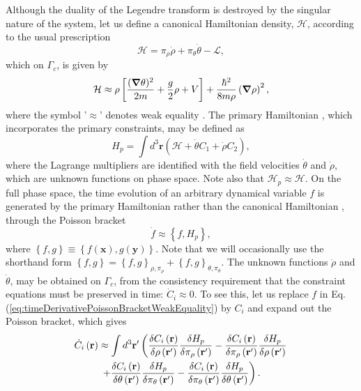 \documentclass[twocolumn, nofootinbib, nobibnotes, amsmath,amssymb,aps, pra, floatfix]{revtex4-1}
\renewcommand{\v}[1]{\ensuremath{\mathbf{#1}}} %
\newcommand{\gv}[1]{\ensuremath{\mbox{\boldmath$ #1 $}}} %
\newcommand{\grad}[1]{\gv{\nabla} #1} %
\begin{document}
Although the duality of the Legendre transform is destroyed by the singular nature of the system, let us define a canonical Hamiltonian density, $\mathcal{H}$, according to the usual prescription
\begin{equation}
  \mathcal{H}=\pi_{\rho}\dot{\rho}+\pi_{\theta}\dot{\theta}-\mathcal{L},
  \label{}
\end{equation}
which on $\Gamma_c$, is given by
\begin{equation}
  \mathcal{H}\approx\rho\left[ \frac{(\grad{\theta})^2}{2m}+\frac{g}{2}\rho+V\right]+\frac{\hbar^2}{8m\rho}\left(\grad{\rho}\right)^2,
  \label{eq:Hamiltonian_density_GP}
\end{equation}
where the symbol '$\approx$' denotes weak equality \cite{dirac2001lectures}.
The primary Hamiltonian \cite{sundermeyer1982constrained}, which incorporates the primary constraints, may be defined as
\begin{equation}
  H_p=\int d^3\v{r}\left( \mathcal{H}+\dot{\theta}C_1+\dot{\rho}C_2 \right),
  \label{eq:hamiltonianPrimaryGPfield}
\end{equation}
where the Lagrange multipliers are identified \cite{das2008lectures} with the field velocities $\dot{\theta}$ and $\dot{\rho}$, which are unknown functions on phase space.
Note also that $\mathcal{H}_p\approx\mathcal{H}$.
On the full phase space, the time evolution of an arbitrary dynamical variable $f$ is generated by the primary Hamiltonian rather than the canonical Hamiltonian \cite{dirac2001lectures,gitman2012quantization,rothe2010classical,das2008lectures}, through the Poisson bracket
\begin{equation}
  \dot{f}\approx\left\{ f,H_p \right\},
  \label{eq:timeDerivativePoissonBracketWeakEquality}
\end{equation}
where $\left\{ f,g \right\}\equiv \left\{ f\left( \v{x} \right),g\left( \v{y} \right) \right\}$. 
Note that we will occasionally use the shorthand form $\left\{ f,g \right\}=\left\{ f,g \right\}_{\rho,\pi_{\rho}}+\left\{ f,g \right\}_{\theta,\pi_{\theta}}$.
The unknown functions $\dot{\rho}$ and $\dot{\theta}$, may be obtained on $\Gamma_c$, from the consistency requirement that the constraint equations must be preserved in time: $\dot{C}_i\approx0$.
To see this, let us replace $f$ in Eq. (\ref{eq:timeDerivativePoissonBracketWeakEquality}) by $C_i$ and expand out the Poisson bracket, which gives
\begin{multline}
  \dot{ C}_i\left( \v{r} \right)\approx \int d^3\v{r}'\left( \frac{\delta C_i\left( \v{r} \right)}{\delta\rho\left( \v{r}' \right)}\frac{\delta H_p}{\delta\pi_{\rho}\left( \v{r}' \right)}- \frac{\delta C_i\left( \v{r} \right)}{ \delta\pi_{\rho}\left( \v{r}' \right)}\frac{\delta H_p}{ \delta\rho\left( \v{r}' \right)} \right. \\
  \left. +\frac{\delta C_i\left( \v{r} \right)}{\delta\theta\left( \v{r}' \right)}\frac{\delta H_p}{\delta\pi_{\theta}\left( \v{r}' \right)}- \frac{\delta C_i\left( \v{r} \right)}{ \delta\pi_{\theta}\left( \v{r}' \right)}\frac{\delta H_p}{ \delta\theta\left( \v{r}' \right)}\vphantom{\int}\right).
  \label{eq:timeDerivativeConstraintsExpandedPoissonBracket}
\end{multline}
\end{document}
